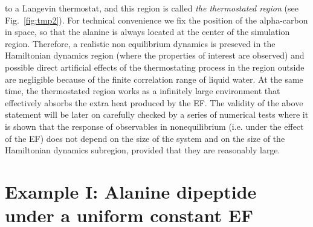 \documentclass[a4paper,preprint,unsortedaddress,onecolumn]{revtex4-1}
\begin{document}
to a Langevin thermostat, and this region is called \emph{the thermostated
region} (see Fig.~\ref{fig:tmp2}). For technical convenience we
fix the position of the alpha-carbon in space, so that the alanine is always
located at the center of the simulation region.
Therefore, a realistic non equilibrium  dynamics is preseved in the Hamiltonian dynamics region (where the properties of interest are observed)
and possible direct artificial effects of the thermostating process in the region outside are negligible because of the finite correlation
range of liquid water.
At the same time, the thermostated region works as a infinitely large
environment that effectively absorbs the extra heat produced by the EF.
The validity of the above
statement will be later on carefully checked by a series of numerical tests where it is shown that
the response of observables in nonequilibrium (i.e. under the effect of the EF) does not depend on the size of the system
and on the size of the Hamiltonian dynamics subregion, provided that they are
reasonably large.



\section{Example I: Alanine dipeptide
  under a uniform  constant EF}
\end{document}
